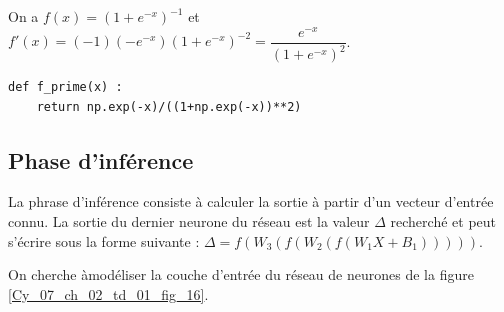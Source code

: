 \ifprof
\begin{corrige}
On a $f(x)=(1+e^{-x})^{-1}$ et $f'(x)=(-1)\left(-e^{-x}\right)(1+e^{-x})^{-2} = \dfrac{e^{-x}}{\left(1+e^{-x}\right)^2}$.
\begin{lstlisting}
def f_prime(x) :
    return np.exp(-x)/((1+np.exp(-x))**2)
\end{lstlisting}
\end{corrige}
\else
\fi

\newpage

\subsection*{Phase d'inférence}
%
%
La phrase d'inférence consiste à calculer la sortie à partir d'un vecteur d'entrée connu. La sortie du dernier neurone du réseau est la valeur $\Delta$ recherché et peut s'écrire sous la forme suivante : 
$\Delta = f\left(W_3\left(f\left(W_2\left(f\left(W_1 X + B_1\right)\right)\right)\right)\right)$.
%

\ifprof
\begin{corrige}
\end{corrige}
\else
\fi

On cherche àmodéliser la couche d'entrée du réseau de neurones de la figure \ref{Cy_07_ch_02_td_01_fig_16}. 


